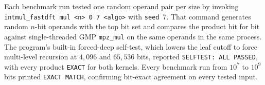 Each benchmark run tested one random operand pair per size by invoking \texttt{intmul\_fastdft mul <n> 0 7 <algo>} with \texttt{seed}~7. That command generates random $n$-bit operands with the top bit set and compares the product bit for bit against single-threaded GMP \texttt{mpz\_mul} on the same operands in the same process. The program's built-in forced-deep self-test, which lowers the leaf cutoff to force multi-level recursion at $4{,}096$ and $65{,}536$ bits, reported \texttt{SELFTEST: ALL PASSED}, with every product \texttt{EXACT} for both kernels. Every benchmark run from $10^7$ to $10^9$ bits printed \texttt{EXACT MATCH}, confirming bit-exact agreement on every tested input.
